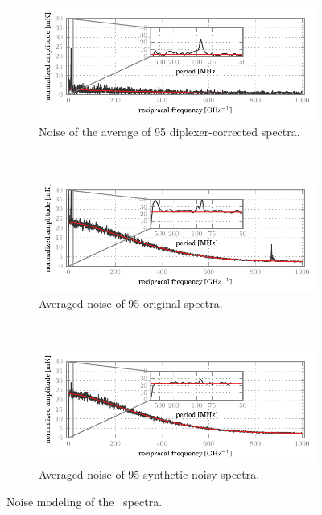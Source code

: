 \begin{figure}[p]
    \centering
    \begin{subfigure}[b]{\textwidth}
        \centering
        \includegraphics{noise_dft_98_correctedavg}
        \vspace{-.8em}
        \caption{Noise of the average of 95  diplexer-corrected spectra.}
    \end{subfigure}
    \\
    \bigskip
    \begin{subfigure}[b]{\textwidth}
        \centering
        \includegraphics{noise_dft_98_original}
        \vspace{-.8em}
        \caption{Averaged noise of 95  original spectra.}
    \end{subfigure}
    \\
    \bigskip
    \begin{subfigure}[b]{\textwidth}
        \centering
        \includegraphics{noise_dft_98_noisy}
        \vspace{-.8em}
        \caption{Averaged noise of 95  synthetic noisy spectra.}
    \end{subfigure}
    \caption{Noise modeling of the~ spectra.}
    \label{fig:noise_model_98}
\end{figure}


